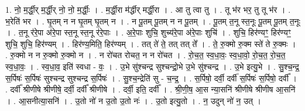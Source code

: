 \documentclass[17pt]{extarticle}
\begin{document}
1. नो॒ म॒र्द्धी॒र् म॒र्द्धी॒र् नो॒ नो॒ म॒र्द्धीः॒ । . म॒र्द्धी॒रा म॑र्द्धीर् मर्द्धी॒रा । . आ तु त्वा तु । . तू भ॑र भर॒ तु तू भ॑र । . भ॒रेति॑ भर । . घृ॒तम् न न घृ॒तम् घृ॒तम् न । . न पू॒तम् पू॒तम् न न पू॒तम् । . पू॒तम् त॒नू स्त॒नूः पू॒तम् पू॒तम् त॒नूः । . त॒नू र॑रे॒पा अ॑रे॒पा स्त॒नू स्त॒नू र॑रे॒पाः । . अ॒रे॒पाः शुचि॒ शुच्य॑रे॒पा अ॑रे॒पाः शुचि॑ । . शुचि॒ हिर॑ण्यꣳ॒॒ हिर॑ण्यꣳ॒॒ शुचि॒ शुचि॒ हिर॑ण्यम् । . हिर॑ण्य॒मिति॒ हिर॑ण्यम् । . तत् ते॑ ते॒ तत् तत् ते᳚ । . ते॒ रु॒क्मो रु॒क्म स्ते॑ ते रु॒क्मः । . रु॒क्मो न न रु॒क्मो रु॒क्मो न । . न रो॑चत रोचत॒ न न रो॑चत । . रो॒च॒त॒ स्व॒धा॒वः॒ स्व॒धा॒वो॒ रो॒च॒त॒ रो॒च॒त॒ स्व॒धा॒वः॒ । . स्व॒धा॒व॒ इति॑ स्वधा - वः॒ । . उ॒भे सु॑श्चन्द्र सुश्चन्द्रो॒भे उ॒भे सु॑श्चन्द्र । . उ॒भे इत्यु॒भे । . सु॒श्च॒न्द्र॒ स॒र्पिषः॑ स॒र्पिषः॑ सुश्चन्द्र सुश्चन्द्र स॒र्पिषः॑ । . सु॒श्च॒न्द्रेति॑ सु - च॒न्द्र॒ । . स॒र्पिषो॒ दर्वी॒ दर्वी॑ स॒र्पिषः॑ स॒र्पिषो॒ दर्वी᳚ । . दर्वी᳚ श्रीणीषे श्रीणीषे॒ दर्वी॒ दर्वी᳚ श्रीणीषे । . दर्वी॒ इति॒ दर्वी᳚ । . श्री॒णी॒ष॒ आ॒स न्या॒सनि॑ श्रीणीषे श्रीणीष आ॒सनि॑ । . आ॒सनीत्या॒सनि॑ । . उ॒तो नो॑ न उ॒तो उ॒तो नः॑ । . उ॒तो इत्यु॒तो । . न॒ उदुन् नो॑ न॒ उत् । \newline
\end{document}
